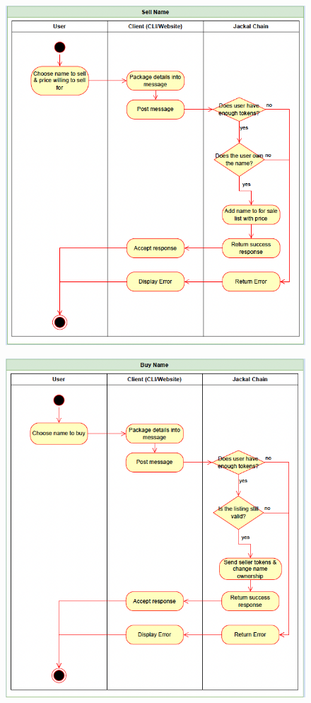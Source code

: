 \documentclass[a4paper]{article}
\begin{document}
\begin{figure}[!htbp]
\centering
\includegraphics[width=1\textwidth]{assets/rns3.png}
\caption{}
\end{figure}

\begin{figure}[!htbp]
\centering
\includegraphics[width=1\textwidth]{assets/rns4.png}
\caption{}
\end{figure}
\end{document}
